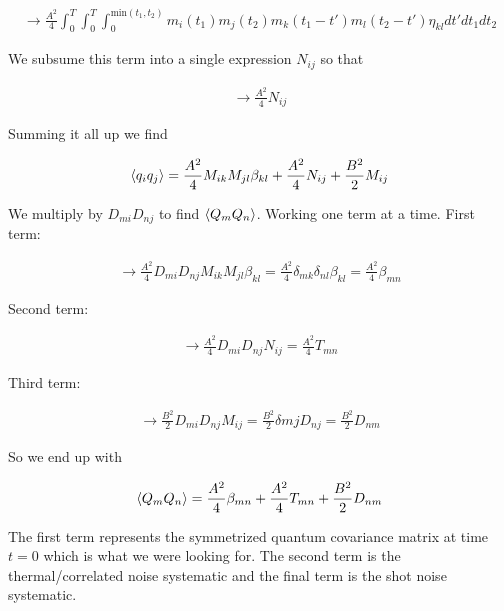 \documentclass[12pt]{article}
\begin{document}
\begin{align}
\rightarrow \frac{A^2}{4} \int_0^T \int_0^T \int_0^{\text{min}(t_1,t_2)} m_i(t_1)m_j(t_2) m_k(t_1-t')m_l(t_2-t')\eta_{kl} dt' dt_1 dt_2
\end{align}

We subsume this term into a single expression $N_{ij}$ so that

\begin{align}
\rightarrow \frac{A^2}{4} N_{ij}
\end{align}

Summing it all up we find

\begin{align}
\braket{q_iq_j} = \frac{A^2}{4}M_{ik}M_{jl}\beta_{kl} + \frac{A^2}{4}N_{ij} + \frac{B^2}{2} M_{ij}
\end{align}

We multiply by $D_{mi}D_{nj}$ to find $\braket{Q_{m}Q_{n}}$. Working one term at a time. First term:

\begin{align}
\rightarrow \frac{A^2}{4} D_{mi}D_{nj}M_{ik}M_{jl}\beta_{kl} = \frac{A^2}{4}\delta_{mk}\delta_{nl}\beta_{kl} = \frac{A^2}{4}\beta_{mn}
\end{align}

Second term:

\begin{align}
\rightarrow \frac{A^2}{4}D_{mi}D_{nj} N_{ij} = \frac{A^2}{4}T_{mn}
\end{align}

Third term:

\begin{align}
\rightarrow \frac{B^2}{2} D_{mi}D_{nj}M_{ij} = \frac{B^2}{2} \delta{mj}D_{nj} = \frac{B^2}{2} D_{nm}
\end{align}

So we end up with

\begin{align}
\braket{Q_{m}Q_{n}} = \frac{A^2}{4}\beta_{mn} + \frac{A^2}{4} T_{mn} + \frac{B^2}{2} D_{nm}
\end{align}

The first term represents the symmetrized quantum covariance matrix at time $t=0$ which is what we were looking for. The second term is the thermal/correlated noise systematic and the final term is the shot noise systematic.
\end{document}
